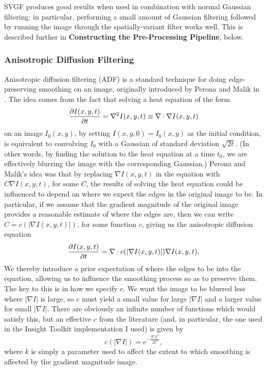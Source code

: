 
SVGF produces good results when used in combination with normal Gaussian filtering: in particular, performing a small amount of Gaussian filtering followed by running the image through the spatially-variant filter works well. This is described further in \textbf{Constructing the Pre-Processing Pipeline}, below.

\subsubsection{Anisotropic Diffusion Filtering}

Anisotropic diffusion filtering (ADF) is a standard technique for doing edge-preserving smoothing on an image, originally introduced by Perona and Malik in \cite{perona90}. The idea comes from the fact that solving a heat equation of the form
%
\[
\frac{\partial I(x,y,t)}{\partial t} = \nabla^2 I(x,y,t) \equiv \nabla \cdot \nabla I(x,y,t)
\]
%
on an image $I_0(x,y)$, by setting $I(x,y,0) = I_0(x,y)$ as the initial condition, is equivalent to convolving $I_0$ with a Gaussian of standard deviation $\sqrt{2t}$. (In other words, by finding the solution to the heat equation at a time $t_0$, we are effectively blurring the image with the corresponding Gaussian.) Perona and Malik's idea was that by replacing $\nabla I(x,y,t)$ in the equation with $C \nabla I(x,y,t)$, for some $C$, the results of solving the heat equation could be influenced to depend on where we expect the edges in the original image to be. In particular, if we assume that the gradient magnitude of the original image provides a reasonable estimate of where the edges are, then we can write $C = c(|\nabla I(x,y,t)|)$, for some function $c$, giving us the anisotropic diffusion equation
%
\[
\frac{\partial I(x,y,t)}{\partial t} = \nabla \cdot c(|\nabla I(x,y,t)|) \nabla I(x,y,t).
\]
%
We thereby introduce a prior expectation of where the edges to be into the equation, allowing us to influence the smoothing process so as to preserve them. The key to this is in how we specify $c$. We want the image to be blurred less where $|\nabla I|$ is large, so $c$ must yield a small value for large $|\nabla I|$ and a larger value for small $|\nabla I|$. There are obviously an infinite number of functions which would satisfy this, but an effective $c$ from the literature (and, in particular, the one used in the Insight Toolkit \cite{ITK} implementation I used) is given by
%
\[
c(|\nabla I|) = e^{-\frac{|\nabla I|^2}{2k^2}},
\]
%
where $k$ is simply a parameter used to affect the extent to which smoothing is affected by the gradient magnitude image.

